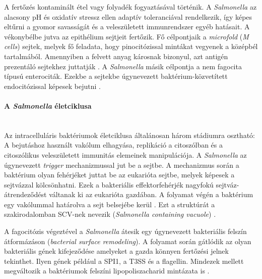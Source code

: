\documentclass[a4paper,12pt]{article}
\begin{document}
		A fertőzés kontaminált étel vagy folyadék fogyaztásával történik. A \textit{Salmonella} az alacsony pH és oxidatív stressz ellen adaptív toleranciával rendelkezik, így képes eltűrni a gyomor savasságát és a veleszületett immunrendszer egyéb hatásait. A vékonybélbe jutva az epithélium sejtjeit fertőzik. Fő célpontjaik a \textit{microfold} (\textit{M cells}) sejtek, melyek fő feladata, hogy pinocitózissal mintákat vegyenek a középbél tartalmából. Amennyiben a felvett anyag károsnak bizonyul, azt antigén prezentáló sejtekhez juttatják \cite{salmonella_and_host_cell_nature}. A \textit{Salmonella} másik célpontja a nem fagocita típusú enterociták. Ezekbe a sejtekbe úgynevezett baktérium-közvetített endocitózissal képesek bejutni \cite{salmonella_and_host_cell_nature}.
		
		
		\paragraph{A \textit{Salmonella} életciklusa} \mbox{}\\
		Az intracelluláris baktériumok életciklusa általánosan három stádiumra osztható: A bejutáshoz használt vakólum elhagyása, replikáció a citoszólban és a citoszólikus veleszületett immunitás elemeinek manipulációja. A \textit{Salmonella} az úgynevezett \textit{trigger} mechanizmussal jut be a sejtbe. A mechanizmus során a baktérium olyan fehérjéket juttat be az eukarióta sejtbe, melyek képesek a sejtvázzal kölcsönhatni. Ezek a bakteriális effektorfehérjék nagyfokú sejtváz-átrendeződést váltanak ki az eukarióta gazdában. A folyamat végén a baktérium egy vakólummal határolva a sejt belsejébe kerül \cite{salmonella_autophagy_nature_old}. Ezt a struktúrát a szakirodalomban SCV-nek nevezik (\textit{Salmonella containing vacuole}) \cite{salmonella_and_host_cell_nature}.
		
		A fagocitózis végeztével a \textit{Salmonella} átesik egy úgynevezett bakteriális felszín átformázáson (\textit{bacterial surface remodeling}). A folyamat során gátlódik az olyan bakteriális gének kifejeződése amelyeket a gazda könnyen fertőzési jelnek tekinthet. Ilyen gének például a SPI1, a T3SS és a flagellin. Mindezek mellett megváltozik a baktériumok felszíni lipopoliszacharid mintázata is  \cite{salmonella_and_host_cell_nature}.
		
\end{document}
